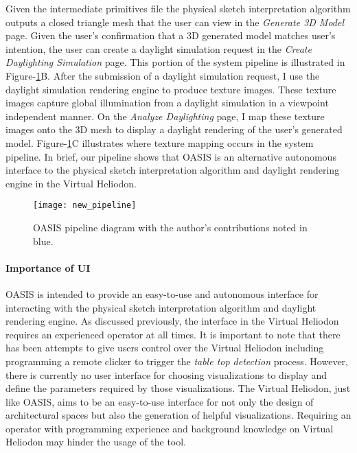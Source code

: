 			Given the intermediate primitives file the physical sketch interpretation algorithm outputs a closed triangle mesh that the user can view in the \textit{Generate 3D Model} page.
			Given the user's confirmation that a 3D generated model matches user's intention, the user can create a daylight simulation request in the \textit{Create Daylighting Simulation} page.
			This portion of the system pipeline is illustrated in Figure-\ref{fig:new_pipeline}B.
			After the submission of a daylight simulation request, I use the daylight simulation rendering engine to produce texture images.
			These texture images capture global illumination from a daylight simulation in a viewpoint independent manner.
			On the \textit{Analyze Daylighting} page, I map these texture images onto the 3D mesh to display a daylight rendering of the user's generated model.
			Figure-\ref{fig:new_pipeline}C illustrates where texture mapping occurs in the system pipeline.
			In brief, our pipeline shows that OASIS is an alternative autonomous interface to the physical sketch interpretation algorithm and daylight rendering engine in the Virtual Heliodon.

			\begin{figure}[h]
			\centering
			\texttt{[image: new\_pipeline]}
			\caption{OASIS pipeline diagram with the author's contributions noted in blue.}
			\label{fig:new_pipeline}
			\end{figure}

		\paragraph{Importance of UI}
		OASIS is intended to provide an easy-to-use  and autonomous interface for interacting with the physical sketch interpretation algorithm and daylight rendering engine. 
		As discussed previously, the interface in the Virtual Heliodon requires an experienced operator at all times.
		It is important to note that there has been attempts to give users control over the Virtual Heliodon including programming a remote clicker to trigger the \textit{table top detection} process.
		However, there is currently no user interface for choosing visualizations to display and define the parameters required by those visualizations.
		The Virtual Heliodon, just like OASIS, aims to be an easy-to-use interface for not only the design of architectural spaces but also the generation of helpful visualizations.
		Requiring an operator with programming experience and background knowledge on Virtual Heliodon may hinder the usage of the tool.





